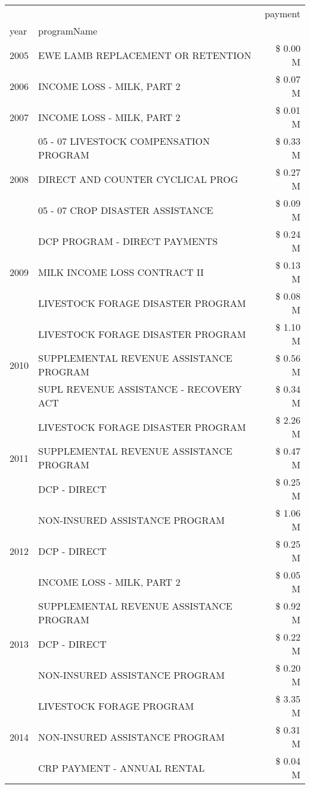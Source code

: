 \begin{tabular}{llr}
\toprule
 &  & payment \\
year & programName &  \\
\midrule
2005 & EWE LAMB REPLACEMENT OR RETENTION & \$ 0.00 M \\
\cline{1-3}
2006 & INCOME LOSS - MILK, PART 2 & \$ 0.07 M \\
\cline{1-3}
2007 & INCOME LOSS - MILK, PART 2 & \$ 0.01 M \\
\cline{1-3}
\multirow[t]{3}{*}{2008} & 05 - 07 LIVESTOCK COMPENSATION PROGRAM & \$ 0.33 M \\
 & DIRECT AND COUNTER CYCLICAL PROG & \$ 0.27 M \\
 & 05 - 07 CROP DISASTER ASSISTANCE & \$ 0.09 M \\
\cline{1-3}
\multirow[t]{3}{*}{2009} & DCP PROGRAM - DIRECT PAYMENTS & \$ 0.24 M \\
 & MILK INCOME LOSS CONTRACT II & \$ 0.13 M \\
 & LIVESTOCK FORAGE DISASTER  PROGRAM & \$ 0.08 M \\
\cline{1-3}
\multirow[t]{3}{*}{2010} & LIVESTOCK FORAGE DISASTER PROGRAM & \$ 1.10 M \\
 & SUPPLEMENTAL REVENUE ASSISTANCE PROGRAM & \$ 0.56 M \\
 & SUPL REVENUE ASSISTANCE - RECOVERY ACT & \$ 0.34 M \\
\cline{1-3}
\multirow[t]{3}{*}{2011} & LIVESTOCK FORAGE DISASTER PROGRAM & \$ 2.26 M \\
 & SUPPLEMENTAL REVENUE ASSISTANCE PROGRAM & \$ 0.47 M \\
 & DCP - DIRECT & \$ 0.25 M \\
\cline{1-3}
\multirow[t]{3}{*}{2012} & NON-INSURED ASSISTANCE PROGRAM & \$ 1.06 M \\
 & DCP - DIRECT & \$ 0.25 M \\
 & INCOME LOSS - MILK, PART 2 & \$ 0.05 M \\
\cline{1-3}
\multirow[t]{3}{*}{2013} & SUPPLEMENTAL REVENUE ASSISTANCE PROGRAM & \$ 0.92 M \\
 & DCP - DIRECT & \$ 0.22 M \\
 & NON-INSURED ASSISTANCE PROGRAM & \$ 0.20 M \\
\cline{1-3}
\multirow[t]{3}{*}{2014} & LIVESTOCK FORAGE PROGRAM & \$ 3.35 M \\
 & NON-INSURED ASSISTANCE PROGRAM & \$ 0.31 M \\
 & CRP PAYMENT - ANNUAL RENTAL & \$ 0.04 M \\

\end{tabular}
